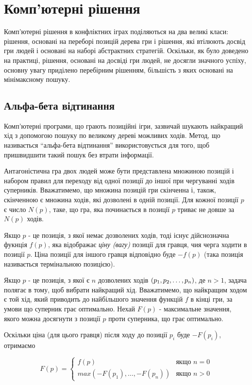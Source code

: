 \documentclass[12pt,a4paper]{article}
\begin{document}
\section{Комп'ютерні рішення}

Комп'ютерні рішення в конфліктних іграх поділяються на два великі класи:
рішення, основані на переборі позицій дерева гри і рішення, які втілюють
досвід гри людей і основані на наборі абстрактних стратегій. Оскільки, як було
доведено на практиці, рішення, основані на досвіді гри людей, не досягли
значного успіху, основну увагу приділено перебірним рішенням, більшість з яких
основані на мінімаксному пошуку.

\subsection{Альфа-бета відтинання}
Комп'ютерні програми, що грають позиційні ігри, зазвичай шукають найкращий хід з
допомогою пошуку по великому дереві можливих ходів. Метод, що називається
``альфа-бета відтинання'' використовується для того, щоб пришвидшити такий
пошук без втрати інформації.

Антагоністична гра двох людей може бути представлена множиною позицій і
набором правил для переходу від одної позиції до іншої при чергуванні ходів
суперників. Вважатимемо, що множина позицій гри скінченна і, також, скінченною
є множина ходів, які дозволені в одній позиції. Для кожної позиції $p$ є число
$N(p)$, таке, що гра, яка починається в позиції $p$ триває не довше за $N(p)$
ходів.

Якщо $p$ - це позиція, з якої немає дозволених ходів, тоді існує дійснозначна
фукнція $f(p)$, яка відображає \textit{ціну (вагу)} позиції для гравця, чия
черга ходити в позиції $p$. Ціна позиції для іншого гравця відповідно буде
$-f(p)$ (така позиція називається термінальною позицією).

Якщо $p$ - це позиція, з якої є $n$ дозволених ходів $(p_1,p_2,\dots,p_n)$, де $n > 1$,
задача полягає в тому, щоб вибрати найкращий хід. Вважатимемо, що найкращим
ходом є той хід, який приводить до найбільшого значення функцій $f$ в кінці
гри, за умови що суперник грає оптимально. Нехай $F(p)$ - максимальне
значення, якого можна досягнути з позиції $p$ проти суперника, що грає
оптимально.

Оскільки ціна (для цього гравця) після ходу до позиції $p_i$ буде $-F(p_i)$,
отримаємо

\begin{equation}
  \label{eq:1}
  F(p) =
  \begin{cases}
    f(p) & \textit{якщо $n = 0$}\\
    max(-F(p_1),\dots,-F(p_n)) & \textit{якщо $n > 0$}
  \end{cases}
\end{equation}
\end{document}
